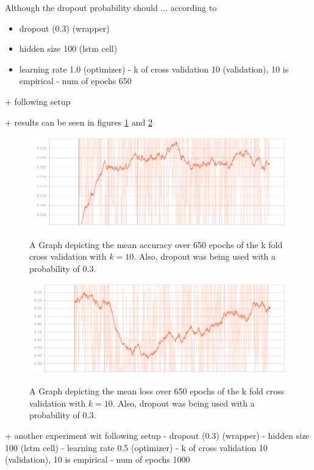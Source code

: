 Although the dropout probability should ... according to \cite{dropout}
\begin{itemize} 
	\item dropout (0.3) (wrapper)
	\item hidden size 100 (lstm cell)
	\item learning rate 1.0 (optimizer)
	- k of cross validation 10 (validation), 10 is empirical
	- num of epochs 650 
\end{itemize}

+ following setup
	
+ results can be seen in figures \ref{fig:acc650epochs} and \ref{fig:loss650epochs}
	
\begin{figure}[!ht]
	\caption{A Graph depicting the mean accuracy over 650 epochs of the k fold cross validation with $k=10$. Also, dropout was being used with a probability of 0.3. }
	\includegraphics[width=0.95\linewidth]{images/evaluation/650-epochs-k-crossvalidation-accuracy-mean.png}
	\label{fig:acc650epochs}
\end{figure}
\begin{figure}[!ht]
	\caption{A Graph depicting the mean loss over 650 epochs of the k fold cross validation with $k=10$. Also, dropout was being used with a probability of 0.3. }
	\includegraphics[width=0.95\linewidth]{images/evaluation/650-epochs-k-crossvalidation-loss-mean.png}
	\label{fig:loss650epochs}
\end{figure}


+ another experiment wit following setup
	- dropout (0.3) (wrapper)
	- hidden size 100 (lstm cell)
	- learning rate 0.5 (optimizer)
	- k of cross validation 10 (validation), 10 is empirical
	- num of epochs 1000


